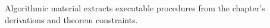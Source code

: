 Algorithmic material extracts executable procedures from the chapter's derivations and theorem constraints.
